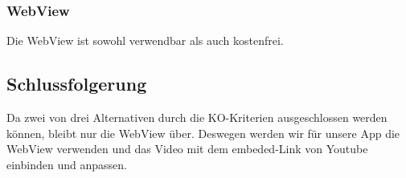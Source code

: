 \documentclass[article,10pt]{scrartcl}
\begin{document}
\subsubsection{WebView}
Die WebView ist sowohl verwendbar als auch kostenfrei.
\subsection{Schlussfolgerung}
Da zwei von drei Alternativen durch die KO-Kriterien ausgeschlossen werden können, bleibt nur die WebView über. Deswegen werden wir für unsere App die WebView verwenden und das Video mit dem embeded-Link von Youtube einbinden und anpassen.
\end{document}
